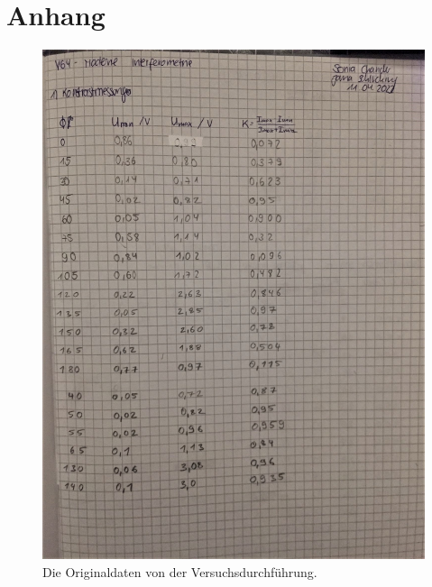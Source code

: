 \section{Anhang}
\label{sec:anhang}

\begin{figure}
    \centering
    \caption{Die Originaldaten von der Versuchsdurchführung.}
    \includegraphics[width=\textwidth]{bilder/Messwerte_Anhang1.jpeg}

\end{figure}
